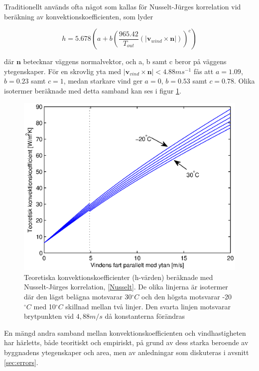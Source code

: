 Traditionellt används ofta något som kallas för Nusselt-Jürges korrelation vid beräkning av konvektionskoefficienten, som lyder

\begin{equation}\label{Nusselt}
h = 5.678 \left( a + b \left( \frac{965.42}{T_{out}}\left(|\mathbf{v}_{wind}\times \mathbf{n}|\right) \right)^c \right)
\end{equation}

där $\mathbf{n}$ betecknar väggens normalvektor, och a, b samt c beror på väggens ytegenskaper. För en skrovlig yta med $|\mathbf{v}_{vind}\times \mathbf{n}| < \unit{4.88}{ms^{-1}}$ fås att $a=1.09$, $b=0.23$ samt $c=1$, medan starkare vind ger $a=0$, $b=0.53$ samt $c=0.78$. Olika isotermer beräknade med detta samband kan ses i figur \ref{hvalues}.

\begin{figure}[hpbt]
\label{hvalues}\centering
\includegraphics[scale=0.7]{images/hvalues.eps}
\caption{Teoretiska konvektionskoefficienter (h-värden) beräknade med Nusselt-Jürges korrelation, \eqref{Nusselt}. De olika linjerna är isotermer där den lägst belägna motsvarar 30$^{\circ}C$ och den högsta motsvarar -20$^{\circ}C$ med 10$^{\circ}C$ skillnad mellan två linjer. Den svarta linjen motsvarar brytpunkten vid $\unit{4,88}{m/s}$ då konstanterna förändras}
\end{figure}

En mängd andra samband mellan konvektionskoefficienten och vindhastigheten har härletts, både teoritiskt och empiriskt, på grund av dess starka beroende av byggnadens ytegenskaper och area, men av anledningar som diskuteras i avsnitt \ref{sec:errors}.\cite{palyvos08}

